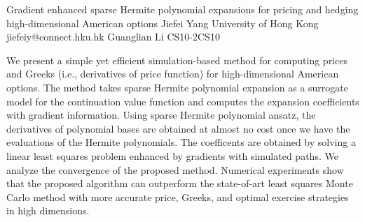\begin{talk}
  {Gradient enhanced sparse Hermite polynomial expansions for pricing and hedging high-dimensional American options}%
  {Jiefei Yang}%
  {University of Hong Kong}%
  {jiefeiy@connect.hku.hk}%
  {Guanglian Li}%
{}{}{CS10-2}{CS10}

			
We present a simple yet efficient simulation-based method for computing prices and Greeks (i.e., derivatives of price function) for high-dimensional American options. The method takes sparse Hermite polynomial expansion as a surrogate model for the continuation value function and computes the expansion coefficients with gradient information. Using sparse Hermite polynomial ansatz, the derivatives of polynomial bases are obtained at almost no cost once we have the evaluations of the Hermite polynomials. The coefficents are obtained by solving a linear least squares problem enhanced by gradients with simulated paths. We analyze the convergence of the proposed method. Numerical experiments show that the proposed algorithm can outperform the state-of-art least squares Monte Carlo method with more accurate price, Greeks, and optimal exercise strategies in high dimensions. 

\medskip


\end{talk}

